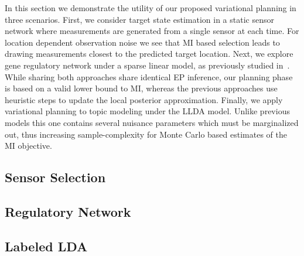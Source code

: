 In this section we demonstrate the utility of our proposed variational
planning in three scenarios.  First, we consider target state
estimation in a static sensor network where measurements are generated
from a single sensor at each time.  For location dependent observation
noise we see that MI based selection leads to drawing measurements
closest to the predicted target location.  Next, we explore gene
regulatory network under a sparse linear model, as previously studied
in~\cite{seeger2008bayesian, steinke2007experimental}.  While sharing
both approaches share identical EP inference, our planning phase is
based on a valid lower bound to MI, whereas the previous approaches
use heuristic steps to update the local posterior approximation.
Finally, we apply variational planning to topic modeling under the
LLDA model.  Unlike previous models this one contains several nuisance
parameters which must be marginalized out, thus increasing
sample-complexity for Monte Carlo based estimates of the MI objective.

\subsection{Sensor Selection}




\subsection{Regulatory Network}

\subsection{Labeled LDA}

